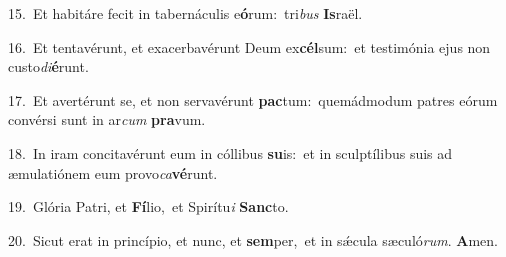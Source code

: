{\numbfont\textcolor{\numbcolor}{15.}}~Et habitáre fecit in tabernáculis e\-\textbf{ó}\-rum:~\star tri\textit{bus} \textbf{Is}\-raël.\par
{\numbfont\textcolor{\numbcolor}{16.}}~Et tentavérunt, et exacerbavérunt Deum ex\-\textbf{cél}\-sum:~\star et testimónia ejus non custo\-\textit{di}\-\textbf{é}runt.\par
{\numbfont\textcolor{\numbcolor}{17.}}~Et avertérunt se, et non servavérunt \textbf{pac}\-tum:~\star quemádmodum patres eórum convérsi sunt in ar\textit{cum} \textbf{pra}\-vum.\par
{\numbfont\textcolor{\numbcolor}{18.}}~In iram concitavérunt eum in cóllibus \textbf{su}\-is:~\star et in sculptílibus suis ad æmulatiónem eum provo\-\textit{ca}\-\textbf{vé}runt.\par
{\numbfont\textcolor{\numbcolor}{19.}}~Glória Patri, et \textbf{Fí}\-lio,~\star et Spirítu\textit{i} \textbf{Sanc}\-to.\par
{\numbfont\textcolor{\numbcolor}{20.}}~Sicut erat in princípio, et nunc, et \textbf{sem}\-per,~\star et in sǽcula sæculó\-\textit{rum}\-. \textbf{A}\-men.\par
